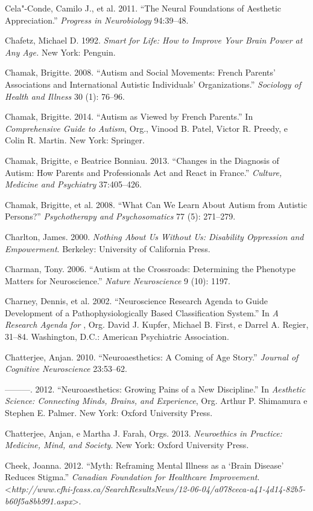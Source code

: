 Cela"-Conde, Camilo J., et al. 2011. ``The Neural Foundations of
Aesthetic Appreciation.'' \emph{Progress in Neurobiology} 94:39--48.

Chafetz, Michael D. 1992. \emph{Smart for Life: How to Improve Your
Brain Power at Any Age.} New York: Penguin.

Chamak, Brigitte. 2008. ``Autism and Social Movements: French Parents'
Associations and International Autistic Individuals' Organizations.''
\emph{Sociology of Health and Illness} 30 (1): 76--96.

Chamak, Brigitte. 2014. ``Autism as Viewed by French Parents.'' In
\emph{Comprehensive Guide to Autism}, Org., Vinood B. Patel, Victor R.
Preedy, e Colin R. Martin. New York: Springer.

Chamak, Brigitte, e Beatrice Bonniau. 2013. ``Changes in the Diagnosis
of Autism: How Parents and Professionals Act and React in France.''
\emph{Culture, Medicine and Psychiatry} 37:405--426.

Chamak, Brigitte, et al. 2008. ``What Can We Learn About Autism from
Autistic Persons?'' \emph{Psychotherapy and Psychosomatics} 77 (5):
271--279.

Charlton, James. 2000. \emph{Nothing About Us Without Us: Disability
Oppression and Empowerment}. Berkeley: University of California Press.

Charman, Tony. 2006. ``Autism at the Crossroads: Determining the
Phenotype Matters for Neuroscience.'' \emph{Nature Neuroscience} 9 (10):
1197.

Charney, Dennis, et al. 2002. ``Neuroscience Research Agenda to Guide
Development of a Pathophysiologically Based Classification System.'' In
\emph{A Research Agenda for }, Org. David J. Kupfer, Michael B.
First, e Darrel A. Regier, 31--84. Washington, D.C.: American
Psychiatric Association.

Chatterjee, Anjan. 2010. ``Neuroaesthetics: A Coming of Age Story.''
\emph{Journal of Cognitive Neuroscience} 23:53--62.

---------. 2012. ``Neuroaesthetics: Growing Pains of a New Discipline.''
In \emph{Aesthetic Science: Connecting Minds, Brains, and Experience},
Org. Arthur P. Shimamura e Stephen E. Palmer. New York: Oxford
University Press.

Chatterjee, Anjan, e Martha J. Farah, Orgs. 2013. \emph{Neuroethics in
Practice: Medicine, Mind, and Society}. New York: Oxford University
Press.

Cheek, Joanna. 2012. ``Myth: Reframing Mental Illness as a `Brain
Disease' Reduces Stigma.'' \emph{Canadian Foundation for Healthcare
Improvement}.
\textless{}\emph{http://www.cfhi-fcass.ca/SearchResultsNews/12-06-04/a078ceca-a41-4d14-82b5-b60f5a8bb991.aspx}\textgreater{}.


